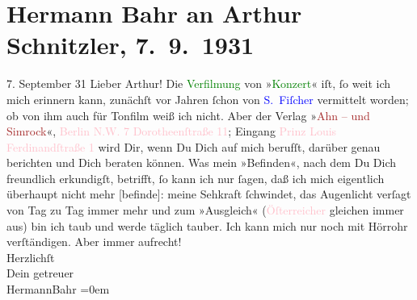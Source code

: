 

               \section[Hermann Bahr an Arthur Schnitzler, 7. 9. 1931]{ Hermann Bahr an Arthur Schnitzler, 7. 9. 1931}\nopagebreak{}\rehead{ }\normalsize\beginnumbering{} \toendnotes[C]{\smallbreak\pagebreak[2]} 
\toendnotes[C]{\smallbreak}\pstart
           \raggedleft{}{\pb}7. September 31\pend
           \pstart{}Lieber Arthur!\pend\pstart
           Die \textcolor{green}{Verfilmung}{} von »\textcolor{green}{Konzert}{}\ledrightnote{\textcolor{green}{Das Konzert. Lustspiel in drei Akten}}« iſt, ſo weit ich mich erinnern kann,
               zunächſt vor Jahren ſchon von \textcolor{blue}{S. Fiſcher}{}\ledrightnote{\textcolor{blue}{Samuel Fischer}}
               vermittelt worden; ob von ihm auch für Tonfilm weiß ich nicht. Aber der Verlag »\textcolor{brown}{Ahn – und Simrock}{}«, \textcolor{pink}{Berlin N.W. 7 Dorotheenſtraße 11}{}\ledrightnote{\textcolor{pink}{Dorotheenstraße}}; Eingang \textcolor{pink}{Prinz
                  Louis Ferdinandſtraße 1}{}\ledrightnote{\textcolor{pink}{Prinz Louis Ferdinandstraße}} wird Dir, wenn Du Dich auf mich berufſt, darüber
               genau berichten und Dich beraten können.\pend
           \pstart
           Was mein »Befinden«, nach dem Du Dich freundlich erkundigſt, betrifft, ſo kann ich
               nur ſagen, daß ich mich eigentlich überhaupt nicht {\pb}mehr {[}befinde{]}: meine Sehkraft ſchwindet, das Augenlicht verſagt
               von Tag zu Tag immer mehr und zum »Ausgleich« (\textcolor{pink}{Öſterreicher}{}\ledrightnote{\textcolor{pink}{Österreich}} gleichen immer aus) bin ich taub und werde täglich tauber. Ich
               kann mich nur noch mit Hörrohr verſtändigen.\pend
           \pstart
           Aber immer aufrecht!{\\[\baselineskip]}Herzlichſt{\\[\baselineskip]}Dein getreuer{\\[\baselineskip]}\spacefill\mbox{HermannBahr}\pend
           \leftskip=0em{}\endnumbering{}  
      